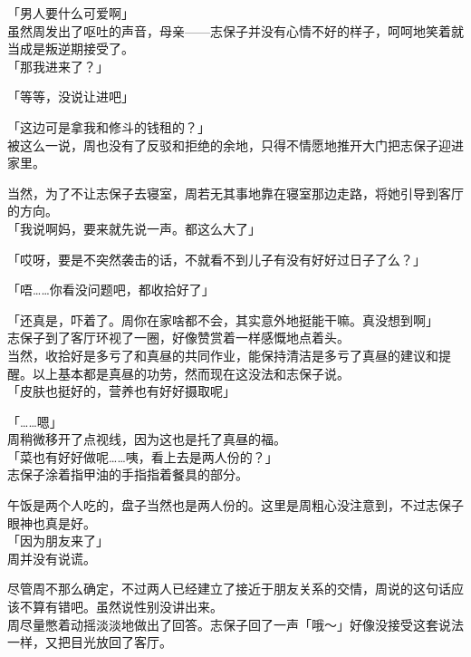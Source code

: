 「男人要什么可爱啊」\\

虽然周发出了呕吐的声音，母亲——志保子并没有心情不好的样子，呵呵地笑着就当成是叛逆期接受了。\\

「那我进来了？」

「等等，没说让进吧」

「这边可是拿我和修斗的钱租的？」\\

被这么一说，周也没有了反驳和拒绝的余地，只得不情愿地推开大门把志保子迎进家里。

当然，为了不让志保子去寝室，周若无其事地靠在寝室那边走路，将她引导到客厅的方向。\\

「我说啊妈，要来就先说一声。都这么大了」

「哎呀，要是不突然袭击的话，不就看不到儿子有没有好好过日子了么？」

「唔……你看没问题吧，都收拾好了」

「还真是，吓着了。周你在家啥都不会，其实意外地挺能干嘛。真没想到啊」\\

志保子到了客厅环视了一圈，好像赞赏着一样感慨地点着头。\\

当然，收拾好是多亏了和真昼的共同作业，能保持清洁是多亏了真昼的建议和提醒。以上基本都是真昼的功劳，然而现在这没法和志保子说。\\

「皮肤也挺好的，营养也有好好摄取呢」

「……嗯」\\

周稍微移开了点视线，因为这也是托了真昼的福。\\

「菜也有好好做呢……咦，看上去是两人份的？」\\

志保子涂着指甲油的手指指着餐具的部分。

午饭是两个人吃的，盘子当然也是两人份的。这里是周粗心没注意到，不过志保子眼神也真是好。\\

「因为朋友来了」\\

周并没有说谎。

尽管周不那么确定，不过两人已经建立了接近于朋友关系的交情，周说的这句话应该不算有错吧。虽然说性别没讲出来。\\

周尽量憋着动摇淡淡地做出了回答。志保子回了一声「哦～」好像没接受这套说法一样，又把目光放回了客厅。

